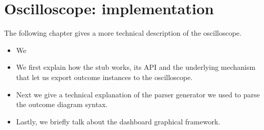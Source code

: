 \chapter{Oscilloscope: implementation}
    The following chapter gives a more technical description of the oscilloscope.
    \begin{itemize}
        \item We    
        \item We first explain how the stub works, its API and the underlying mechanism that let us export outcome instances to the oscilloscope.
        \item Next we give a technical explanation of the parser generator we used to parse the outcome diagram syntax.
        \item Lastly, we briefly talk about the dashboard graphical framework.
    \end{itemize}

    
    
    
    
